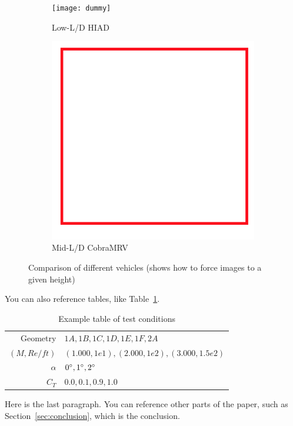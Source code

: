 \begin{figure}[htb] %
\begin{center}
    \newcommand\picW{0.49\textwidth}
    \newcommand\picH{0.75\textwidth}
    \begin{subfigure}{\picW}
      \centering
        \texttt{[image: dummy]}
        \caption{ Low-L/D HIAD }
        \label{fig:hiadconcept}
    \end{subfigure}
    \begin{subfigure}{\picW}
      \centering
      \includegraphics[trim=0 0 0 0, clip, height=\picH]{Images/dummy.png}
        \caption{ Mid-L/D CobraMRV }
        \label{fig:cobraconcept}
    \end{subfigure}
    \caption{ Comparison of different vehicles (shows how to force images to a given height)~\cite{halstrom2021aerodynamic} }
    \label{fig:vehicleconcepts}
\end{center}
\end{figure}

You can also reference tables, like Table~\ref{tab:tableexample}.

\begin{table}[H] %
\begin{center}
\caption{Example table of test conditions}
\label{tab:tableexample}
\begin{tabular}{r | l}
Geometry      & \(1A, 1B, 1C, 1D, \boxed{1E, 1F}, 2A\) \\
\((M,Re/ft)\) & \((1.000,1e1), (2.000,1e2), (3.000,1.5e2)\) \\
\(\alpha\)    & \(\SI{0}{\degree}, \SI{1}{\degree}, \SI{2}{\degree}\) \\
\(C_T\)       & \(0.0, 0.1, 0.9, 1.0\) \\
\end{tabular}
\end{center}
\end{table}




Here is the last paragraph.
You can reference other parts of the paper, such as Section~\ref{sec:conclusion}, which is the conclusion.
